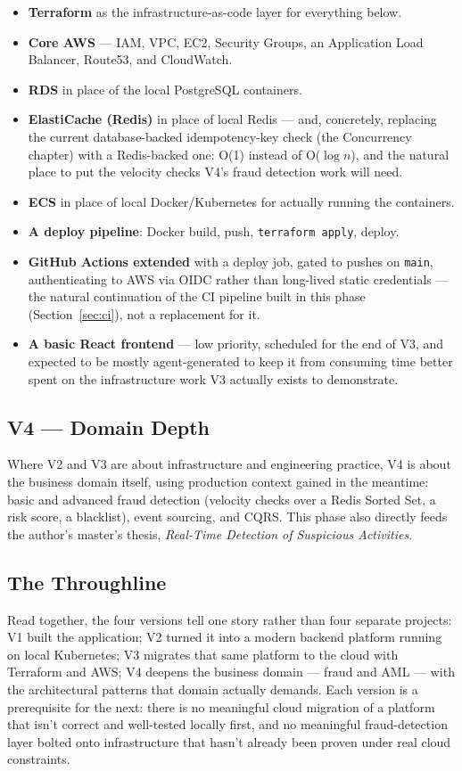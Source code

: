 \begin{itemize}
    \item \textbf{Terraform} as the infrastructure-as-code layer for everything below.
    \item \textbf{Core AWS} --- IAM, VPC, EC2, Security Groups, an Application Load Balancer, Route53, and CloudWatch.
    \item \textbf{RDS} in place of the local PostgreSQL containers.
    \item \textbf{ElastiCache (Redis)} in place of local Redis --- and, concretely, replacing the current database-backed idempotency-key check (the Concurrency chapter) with a Redis-backed one: O(1) instead of O($\log n$), and the natural place to put the velocity checks V4's fraud detection work will need.
    \item \textbf{ECS} in place of local Docker/Kubernetes for actually running the containers.
    \item \textbf{A deploy pipeline}: Docker build, push, \texttt{terraform apply}, deploy.
    \item \textbf{GitHub Actions extended} with a deploy job, gated to pushes on \texttt{main}, authenticating to AWS via OIDC rather than long-lived static credentials --- the natural continuation of the CI pipeline built in this phase (Section~\ref{sec:ci}), not a replacement for it.
    \item \textbf{A basic React frontend} --- low priority, scheduled for the end of V3, and expected to be mostly agent-generated to keep it from consuming time better spent on the infrastructure work V3 actually exists to demonstrate.
\end{itemize}

\subsection{V4 --- Domain Depth}

Where V2 and V3 are about infrastructure and engineering practice, V4 is about the business domain itself, using production context gained in the meantime: basic and advanced fraud detection (velocity checks over a Redis Sorted Set, a risk score, a blacklist), event sourcing, and CQRS. This phase also directly feeds the author's master's thesis, \emph{Real-Time Detection of Suspicious Activities}.

\subsection{The Throughline}

Read together, the four versions tell one story rather than four separate projects: V1 built the application; V2 turned it into a modern backend platform running on local Kubernetes; V3 migrates that same platform to the cloud with Terraform and AWS; V4 deepens the business domain --- fraud and AML --- with the architectural patterns that domain actually demands. Each version is a prerequisite for the next: there is no meaningful cloud migration of a platform that isn't correct and well-tested locally first, and no meaningful fraud-detection layer bolted onto infrastructure that hasn't already been proven under real cloud constraints.
